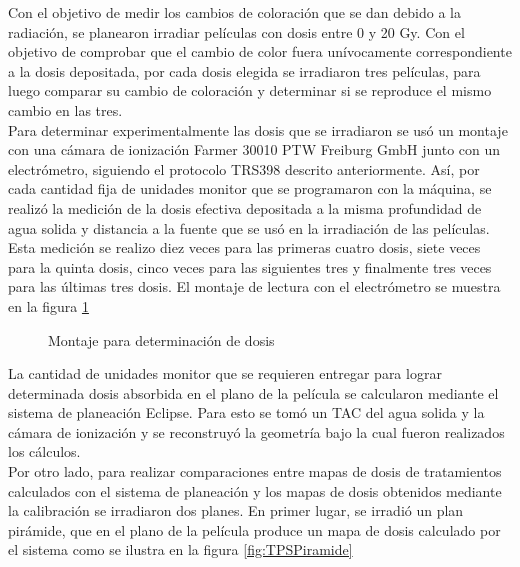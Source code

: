 Con el objetivo de medir los cambios de coloración que se dan debido a la radiación, se planearon irradiar películas con dosis entre 0 y 20 Gy. Con el objetivo de comprobar que el cambio de color fuera unívocamente correspondiente a la dosis depositada, por cada dosis elegida se irradiaron tres películas, para luego comparar su cambio de coloración y determinar si se reproduce el mismo cambio en las tres.\\ 


Para determinar experimentalmente las dosis que se irradiaron se usó un montaje con una cámara de ionización Farmer 30010 PTW Freiburg GmbH junto con un electrómetro, siguiendo el protocolo TRS398 descrito anteriormente. Así, por cada cantidad fija de unidades monitor que se programaron con la máquina, se realizó la medición de la dosis efectiva depositada a la misma profundidad de agua solida y distancia a la fuente que se usó en la irradiación de las películas. Esta medición se realizo diez veces para las primeras cuatro dosis, siete veces para la quinta dosis, cinco veces para las siguientes tres y finalmente tres veces para las últimas tres dosis. El montaje de lectura con el electrómetro se muestra en la figura \ref{fig:Montajeelectrometro}\\
\begin{figure}
	\centering
	
	\caption{Montaje para determinación de dosis}
	\label{fig:Montajeelectrometro}
\end{figure}
La cantidad de unidades monitor que se requieren entregar para lograr determinada dosis absorbida en el plano de la película se calcularon mediante el sistema de planeación Eclipse. Para esto se tomó un TAC del agua solida y la cámara de ionización y se reconstruyó la geometría bajo la cual fueron realizados los cálculos.\\

Por otro lado, para realizar comparaciones entre mapas de dosis de tratamientos calculados con el sistema de planeación y los mapas de dosis obtenidos mediante la calibración  se irradiaron dos planes. En primer lugar, se irradió un plan pirámide, que en el plano de la película produce un mapa de dosis calculado por el sistema como se ilustra en la figura \ref{fig:TPSPiramide}\\


